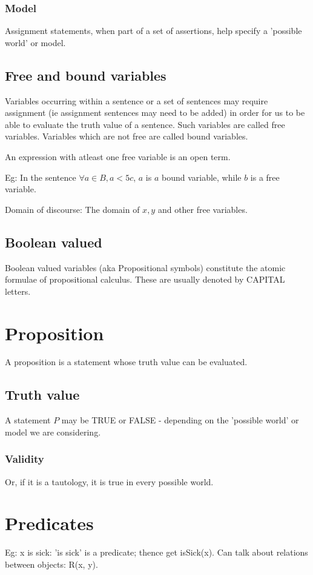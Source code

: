 \documentclass[oneside, article]{memoir}
\begin{document}
\subsubsection{Model}
Assignment statements, when part of a set of assertions, help specify a 'possible world' or model.

\subsection{Free and bound variables}
Variables occurring within a sentence or a set of sentences may require assignment (ie assignment sentences may need to be added) in order for us to be able to evaluate the truth value of a sentence. Such variables are called free variables. Variables which are not free are called bound variables.

An expression with atleast one free variable is an open term.

Eg: In the sentence $\forall a \in B, a<5c$, $a$ is $a$ bound variable, while $b$ is a free variable.

Domain of discourse: The domain of $x, y$ and other free variables. 

\subsection{Boolean valued}
Boolean valued variables (aka Propositional symbols) constitute the atomic formulae of propositional calculus. These are usually denoted by CAPITAL letters.

\section{Proposition}
A proposition is a statement whose truth value can be evaluated.

\subsection{Truth value}
A statement $P$ may be TRUE or FALSE - depending on the 'possible world' or model we are considering.

\subsubsection{Validity}
Or, if it is a tautology, it is true in every possible world.

\section{Predicates}
Eg: x is sick: 'is sick' is a predicate; thence get isSick(x). Can talk about relations between objects: R(x, y).
\end{document}

